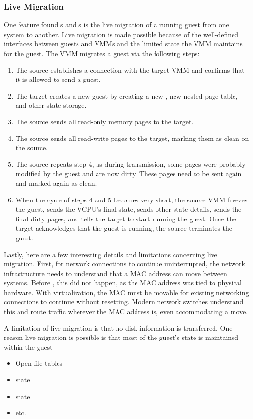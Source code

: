 \subsubsection{Live Migration}\label{subsubsec:VM_Live_Migration}
One feature found s and s is the live migration of a running guest from one system to another.
Live migration is made possible because of the well-defined interfaces between guests and VMMs and the limited state the VMM maintains for the guest.
The VMM migrates a guest via the following steps:
\begin{enumerate}[noitemsep]
\item The source  establishes a connection with the target VMM and confirms that it is allowed to send a guest.
\item The target creates a new guest by creating a new , new nested page table, and other state storage.
\item The source sends all read-only memory pages to the target.
\item The source sends all read-write pages to the target, marking them as clean on the source.
\item The source repeats step 4, as during transmission, some pages were probably modified by the guest and are now dirty.
  These pages need to be sent again and marked again as clean.
\item When the cycle of steps 4 and 5 becomes very short, the source VMM freezes the guest, sends the VCPU’s final state, sends other state details, sends the final dirty pages, and tells the target to start running the guest.
  Once the target acknowledges that the guest is running, the source terminates the guest.
\end{enumerate}

Lastly, here are a few interesting details and limitations concerning live migration.
First, for network connections to continue uninterrupted, the network infrastructure needs to understand that a MAC address can move between systems.
Before , this did not happen, as the MAC address was tied to physical hardware.
With virtualization, the MAC must be movable for existing networking connections to continue without resetting.
Modern network switches understand this and route traffic wherever the MAC address is, even accommodating a move.

A limitation of live migration is that no disk information is transferred.
One reason live migration is possible is that most of the guest’s state is maintained within the guest
\begin{itemize}[noitemsep]
\item Open file tables
\item {} state
\item {} state
\item etc.
\end{itemize}

